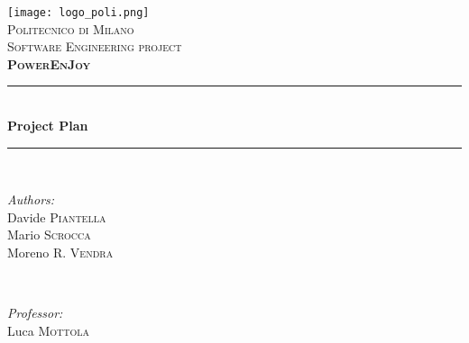 \begin{titlepage}
\newcommand{\HRule}{\rule{\linewidth}{0.5mm}} %

\center %
 
\texttt{[image: logo\_poli.png]}\\[0.5cm] %
\textsc{\LARGE Politecnico di Milano}\\[2cm] %
\textsc{\Large Software Engineering  project}\\[0.5cm] %
\textsc{\large \textbf{PowerEnJoy}}\\[1.5cm] %


\HRule \\[0.4cm]
{ \huge \bfseries Project Plan}\\[0.4cm] %
\HRule \\[1.5cm]
 

\begin{minipage}{0.4\textwidth}
\begin{flushleft} \large
\emph{Authors:}\\
Davide \textsc{Piantella}\\
Mario \textsc{Scrocca}\\
Moreno R. \textsc{Vendra} %
\end{flushleft}
\end{minipage}
~
\begin{minipage}{0.4\textwidth}
\begin{flushright} \large
\emph{Professor:} \\
Luca \textsc{Mottola} %
\end{flushright}
\end{minipage}\\[2cm]


\end{titlepage}
